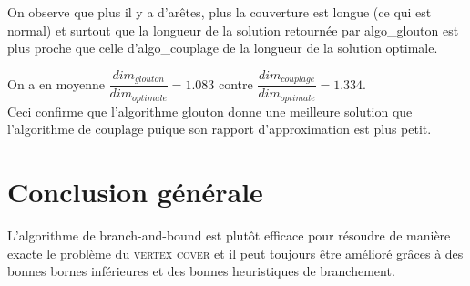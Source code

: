 \documentclass[12pt]{article}
\begin{document}
        On observe que plus il y a d'arêtes, plus la couverture est longue (ce qui est normal) et surtout que la longueur de la solution retournée par algo\_glouton est plus proche que celle d'algo\_couplage de la longueur de la solution optimale.
        
        On a en moyenne $\dfrac{dim_{glouton}}{dim_{optimale}} = 1.083 $ contre $\dfrac{dim_{couplage}}{dim_{optimale}} = 1.334 $. \\
        Ceci confirme que l'algorithme glouton donne une meilleure solution que l'algorithme de couplage puique son rapport d'approximation est plus petit.

\section{Conclusion générale}

    L'algorithme de branch-and-bound est plutôt efficace pour résoudre de manière exacte le problème du \textsc{vertex cover} et il peut toujours être amélioré grâces à des bonnes bornes inférieures et des bonnes heuristiques de branchement.       
\end{document}
